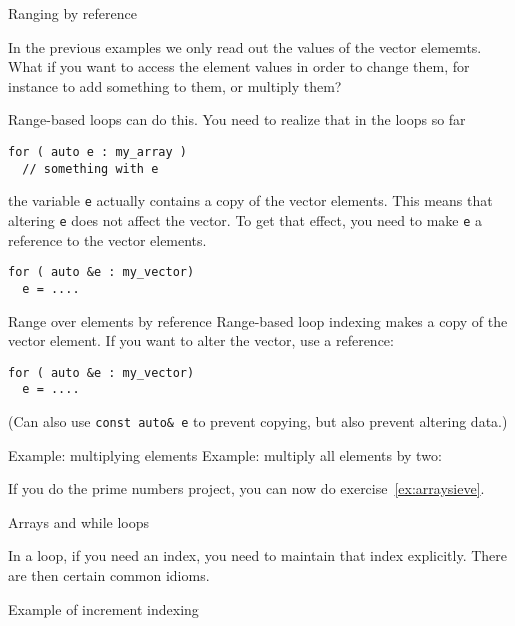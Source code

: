  {Ranging by reference}

In the previous examples we only read out the values
of the vector elememts.
What if you want to access the element values in order to  change them,
for instance to add something to them, or multiply them?

Range-based loops can do this.
You need to realize that in the loops so far
\begin{lstlisting}
for ( auto e : my_array )
  // something with e  
\end{lstlisting}
the variable \lstinline{e} actually contains a copy of the vector elements.
This means that altering \lstinline{e} does not affect the vector.
To get that effect, you need to make \lstinline{e} a reference to the vector elements.

\begin{lstlisting}
for ( auto &e : my_vector)
  e = ....
\end{lstlisting}

\begin{slide}{Range over elements by reference}
  \label{sl:vector-range-ref}
  Range-based loop indexing makes a copy of the vector element. If you
  want to alter the vector, use a reference:
\begin{lstlisting}
for ( auto &e : my_vector)
  e = ....
\end{lstlisting}
%

(Can also use \lstinline{const auto& e} to prevent copying, but also
prevent altering data.)
\end{slide}

\begin{block}{Example: multiplying elements}
  \label{sl:range-ref-ex}
Example: multiply all elements by two:
\end{block}

\begin{exercise}
  If you do the prime numbers project, you can now do exercise~\ref{ex:arraysieve}.
\end{exercise}

 {Arrays and while loops}

In a  loop, if you need an index,
you need to maintain that index explicitly.
There are then certain common idioms.

\begin{block}{Example of increment indexing}
  \label{sl:plusplusexample}
\end{block}


